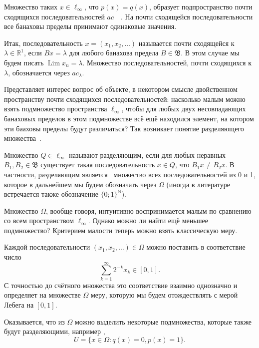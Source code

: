 \documentclass[a4paper,openbib]{report}
\theoremstyle{definition}
\begin{document}
Множество таких $x\in\ell_\infty$, что $p(x)=q(x)$,
образует подпространство почти сходящихся последовательностей $ac$~~\cite{lorentz1948contribution}.
На почти сходящейся последовательности все банаховы пределы принимают одинаковые значения.

Итак, последовательность $x = (x_1, x_2, \ldots)$ называется почти
сходящейся к $\lambda \in \mathbb R^1$, если $Bx = \lambda$ для любого банахова
предела $B \in \mathfrak B$.
В этом случае мы будем писать $\operatorname{Lim} x_n = \lambda$. Множество
последовательностей, почти сходящихся к $\lambda$, обозначается через $ac_\lambda$.


Представляет интерес вопрос об объекте, в некотором смысле двойственном пространству почти сходящихся последовательностей:
насколько малым можно взять подмножество пространства $\ell_\infty$,
чтобы для любых двух несовпадающих банаховых пределов в этом подмножестве всё ещё находился элемент,
на котором эти бааховы пределы будут различаться?
Так возникает понятие разделяющего множества~\cite[\S 3]{Semenov2014geomprops}.

Множество $Q\in\ell_\infty$ называют разделяющим, если
для любых неравных $B_1, B_2\in\mathfrak{B}$ существует такая последовательность $x\in Q$,
что $B_1 x \neq B_2 x$.
В частности, разделяющим является~\cite{semenov2010characteristic} множество всех последовательностей из 0 и 1,
которое в дальнейшем мы будем обозначать через $\Omega$
(иногда в литературе встречается также обозначение $\{0;1\}^\mathbb{N}$).

Множество $\Omega$, вообще говоря, интуитивно воспринимается малым по сравнению со всем пространством $\ell_\infty$.
Однако можно ли найти ещё меньшее подмножество? Критерием малости теперь можно взять классическую меру.

Каждой последовательности $(x_1, x_2, \dots)\in \Omega$ можно поставить в соответствие число
\begin{equation}\label{eq:bijection_omega_0_1}
	\sum_{k=1}^\infty 2^{-k} x_k \in [0,1]
	.
\end{equation}
С точностью до счётного множества это соответствие взаимно однозначно и определяет на множестве $\Omega$ меру,
которую мы будем отождествлять с мерой Лебега на $[0,1]$.

Оказывается, что из $\Omega$ можно выделить некоторые подмножества, которые также будут разделяющими,
например \cite[\S 3, Теорема 11]{Semenov2014geomprops},
\begin{equation}
	U = \{ x\in\Omega: q(x) = 0, p(x) = 1 \}
	.
\end{equation}
\end{document}
